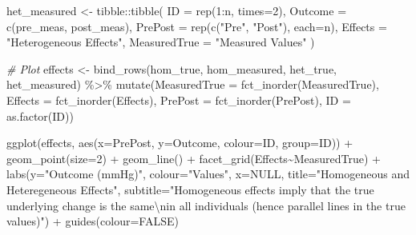 \documentclass[
]{article}
\newenvironment{Shaded}{\begin{snugshade}}{\end{snugshade}}
\newcommand{\AttributeTok}[1]{\textcolor[rgb]{0.77,0.63,0.00}{#1}}
\newcommand{\CommentTok}[1]{\textcolor[rgb]{0.56,0.35,0.01}{\textit{#1}}}
\newcommand{\ConstantTok}[1]{\textcolor[rgb]{0.00,0.00,0.00}{#1}}
\newcommand{\DecValTok}[1]{\textcolor[rgb]{0.00,0.00,0.81}{#1}}
\newcommand{\FunctionTok}[1]{\textcolor[rgb]{0.00,0.00,0.00}{#1}}
\newcommand{\NormalTok}[1]{#1}
\newcommand{\OtherTok}[1]{\textcolor[rgb]{0.56,0.35,0.01}{#1}}
\newcommand{\SpecialCharTok}[1]{\textcolor[rgb]{0.00,0.00,0.00}{#1}}
\newcommand{\StringTok}[1]{\textcolor[rgb]{0.31,0.60,0.02}{#1}}
\begin{document}
\begin{Shaded}
\begin{Highlighting}[]
\NormalTok{het\_measured }\OtherTok{\textless{}{-}}\NormalTok{ tibble}\SpecialCharTok{::}\FunctionTok{tibble}\NormalTok{(}
  \AttributeTok{ID =} \FunctionTok{rep}\NormalTok{(}\DecValTok{1}\SpecialCharTok{:}\NormalTok{n, }\AttributeTok{times=}\DecValTok{2}\NormalTok{),}
  \AttributeTok{Outcome =} \FunctionTok{c}\NormalTok{(pre\_meas, post\_meas),}
  \AttributeTok{PrePost =} \FunctionTok{rep}\NormalTok{(}\FunctionTok{c}\NormalTok{(}\StringTok{"Pre"}\NormalTok{, }\StringTok{"Post"}\NormalTok{), }\AttributeTok{each=}\NormalTok{n),}
  \AttributeTok{Effects =} \StringTok{"Heterogeneous Effects"}\NormalTok{,}
  \AttributeTok{MeasuredTrue =} \StringTok{"Measured Values"}
\NormalTok{)}

\CommentTok{\# Plot}
\NormalTok{effects }\OtherTok{\textless{}{-}} \FunctionTok{bind\_rows}\NormalTok{(hom\_true, hom\_measured, het\_true, het\_measured) }\SpecialCharTok{\%\textgreater{}\%} 
  \FunctionTok{mutate}\NormalTok{(}\AttributeTok{MeasuredTrue =} \FunctionTok{fct\_inorder}\NormalTok{(MeasuredTrue),}
         \AttributeTok{Effects =} \FunctionTok{fct\_inorder}\NormalTok{(Effects),}
         \AttributeTok{PrePost =} \FunctionTok{fct\_inorder}\NormalTok{(PrePost),}
         \AttributeTok{ID =} \FunctionTok{as.factor}\NormalTok{(ID))}

\FunctionTok{ggplot}\NormalTok{(effects, }\FunctionTok{aes}\NormalTok{(}\AttributeTok{x=}\NormalTok{PrePost, }\AttributeTok{y=}\NormalTok{Outcome, }\AttributeTok{colour=}\NormalTok{ID, }\AttributeTok{group=}\NormalTok{ID)) }\SpecialCharTok{+}
  \FunctionTok{geom\_point}\NormalTok{(}\AttributeTok{size=}\DecValTok{2}\NormalTok{) }\SpecialCharTok{+}
  \FunctionTok{geom\_line}\NormalTok{() }\SpecialCharTok{+}
  \FunctionTok{facet\_grid}\NormalTok{(Effects}\SpecialCharTok{\textasciitilde{}}\NormalTok{MeasuredTrue) }\SpecialCharTok{+}
  \FunctionTok{labs}\NormalTok{(}\AttributeTok{y=}\StringTok{"Outcome (mmHg)"}\NormalTok{,}
       \AttributeTok{colour=}\StringTok{"Values"}\NormalTok{,}
       \AttributeTok{x=}\ConstantTok{NULL}\NormalTok{,}
       \AttributeTok{title=}\StringTok{"Homogeneous and Heteregeneous Effects"}\NormalTok{,}
       \AttributeTok{subtitle=}\StringTok{"Homogeneous effects imply that the true underlying change is the same}\SpecialCharTok{\textbackslash{}n}\StringTok{in all individuals (hence parallel lines in the true values)"}\NormalTok{) }\SpecialCharTok{+}
  \FunctionTok{guides}\NormalTok{(}\AttributeTok{colour=}\ConstantTok{FALSE}\NormalTok{)}
\end{Highlighting}
\end{Shaded}
\end{document}
